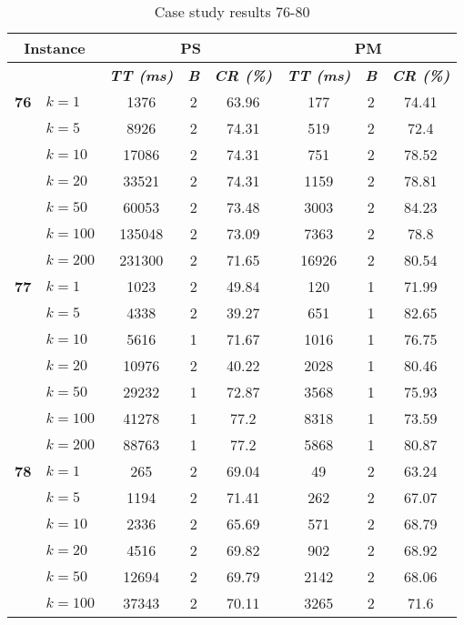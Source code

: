     \begin{table}[htbp]
    \caption{Case study results 76-80}
    \centering
    \begin{tabular}{|l|l|c|c|c|c|c|c|}
    \hline
    \multicolumn{ 2}{|c|}{\textbf{Instance}} & \multicolumn{ 3}{c|}{\textbf{PS}} & \multicolumn{ 3}{c|}{\textbf{PM}} \\ \hline
    \multicolumn{ 2}{|l|}{} & \textbf{\textit{TT (ms)}} & \textbf{\textit{B}} & \textbf{\textit{CR (\%)}} & \textbf{\textit{TT (ms)}} & \textbf{\textit{B}} & \textbf{\textit{CR (\%)}} \\ \hline
    \multicolumn{1}{|r|}{\textbf{76}} & $k=1$ & 1376 & 2 & 63.96 & 177 & 2 & 74.41 \\ 
     & $k=5$ & 8926 & 2 & 74.31 & 519 & 2 & 72.4 \\ 
     & $k=10$ & 17086 & 2 & 74.31 & 751 & 2 & 78.52 \\ 
     & $k=20$ & 33521 & 2 & 74.31 & 1159 & 2 & 78.81 \\ 
     & $k=50$ & 60053 & 2 & 73.48 & 3003 & 2 & 84.23 \\ 
     & $k=100$ & 135048 & 2 & 73.09 & 7363 & 2 & 78.8 \\ 
     & $k=200$ & 231300 & 2 & 71.65 & 16926 & 2 & 80.54 \\ \hline
    \multicolumn{1}{|r|}{\textbf{77}} & $k=1$ & 1023 & 2 & 49.84 & 120 & 1 & 71.99 \\ 
     & $k=5$ & 4338 & 2 & 39.27 & 651 & 1 & 82.65 \\ 
     & $k=10$ & 5616 & 1 & 71.67 & 1016 & 1 & 76.75 \\ 
     & $k=20$ & 10976 & 2 & 40.22 & 2028 & 1 & 80.46 \\ 
     & $k=50$ & 29232 & 1 & 72.87 & 3568 & 1 & 75.93 \\ 
     & $k=100$ & 41278 & 1 & 77.2 & 8318 & 1 & 73.59 \\ 
     & $k=200$ & 88763 & 1 & 77.2 & 5868 & 1 & 80.87 \\ \hline
    \multicolumn{1}{|r|}{\textbf{78}} & $k=1$ & 265 & 2 & 69.04 & 49 & 2 & 63.24 \\ 
     & $k=5$ & 1194 & 2 & 71.41 & 262 & 2 & 67.07 \\ 
     & $k=10$ & 2336 & 2 & 65.69 & 571 & 2 & 68.79 \\ 
     & $k=20$ & 4516 & 2 & 69.82 & 902 & 2 & 68.92 \\ 
     & $k=50$ & 12694 & 2 & 69.79 & 2142 & 2 & 68.06 \\ 
     & $k=100$ & 37343 & 2 & 70.11 & 3265 & 2 & 71.6 \\ 

\end{tabular}
\end{table}
